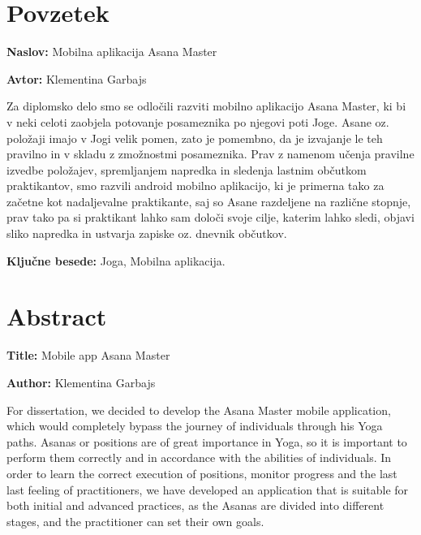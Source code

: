 \documentclass[a4paper, 12pt]{book}
\newcommand{\ttitle}{Mobilna aplikacija Asana Master}
\newcommand{\ttitleEn}{Mobile app Asana Master}
\newcommand{\tauthor}{Klementina Garbajs}
\newcommand{\tkeywords}{Joga, Mobilna aplikacija}
\newcommand{\clearemptydoublepage}{\newpage{\pagestyle{empty}\cleardoublepage}}
\begin{document}
\clearemptydoublepage

\chapter*{Povzetek}

\noindent\textbf{Naslov:} \ttitle
\bigskip

\noindent\textbf{Avtor:} \tauthor
\bigskip

\noindent 
Za diplomsko delo smo se odločili razviti mobilno aplikacijo Asana Master, ki bi v neki celoti zaobjela potovanje posameznika po njegovi poti Joge. Asane oz. položaji imajo v Jogi velik pomen, zato je pomembno, da je izvajanje le teh pravilno in v skladu z zmožnostmi posameznika. Prav z namenom učenja pravilne izvedbe položajev, spremljanjem napredka in sledenja lastnim občutkom praktikantov, smo razvili android mobilno aplikacijo, ki je primerna tako za začetne kot nadaljevalne praktikante, saj so Asane razdeljene na različne stopnje, prav tako pa si praktikant lahko sam določi svoje cilje, katerim lahko sledi, objavi sliko napredka in ustvarja zapiske oz. dnevnik občutkov.

\bigskip

\noindent\textbf{Ključne besede:} \tkeywords.
\clearemptydoublepage

\chapter*{Abstract}

\noindent\textbf{Title:} \ttitleEn
\bigskip

\noindent\textbf{Author:} \tauthor
\bigskip

\noindent 

For dissertation, we decided to develop the Asana Master mobile application, which would completely bypass the journey of individuals through his Yoga paths. Asanas or  positions are of great importance in Yoga, so it is important to perform them correctly and in accordance with the abilities of individuals. In order to learn the correct execution of positions, monitor progress and the last last feeling of practitioners, we have developed an application that is suitable for both initial and advanced practices, as the Asanas are divided into different stages, and the practitioner can set their own goals.
\bigskip
\end{document}
